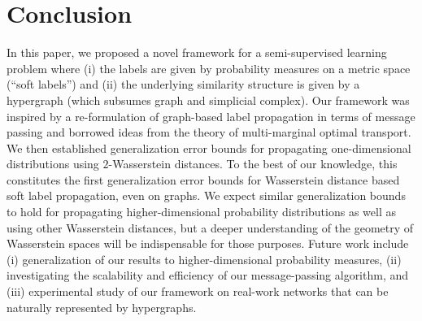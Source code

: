 \documentclass[letterpaper]{article} %
\begin{document}

\section{Conclusion}
In this paper, we proposed a novel framework for a semi-supervised learning problem where (i) the labels are given by probability measures on a metric space (``soft labels'') and (ii) the underlying similarity structure is given by a hypergraph (which subsumes graph and simplicial complex). Our framework was inspired by a re-formulation of graph-based label propagation in terms of message passing and borrowed ideas from the theory of multi-marginal optimal transport. We then established generalization error bounds for propagating one-dimensional distributions using $2$-Wasserstein distances. To the best of our knowledge, this constitutes the first generalization error bounds for Wasserstein distance based soft label propagation, even on graphs. We expect similar generalization bounds to hold for propagating higher-dimensional probability distributions as well as using other Wasserstein distances, but a deeper understanding of the geometry of Wasserstein spaces will be indispensable for those purposes. Future work include (i) generalization of our results to higher-dimensional probability measures, (ii) investigating the scalability and efficiency of our message-passing algorithm, and (iii) experimental study of our framework on  real-work networks that can be naturally represented by hypergraphs.   
	
	

	
\end{document}
